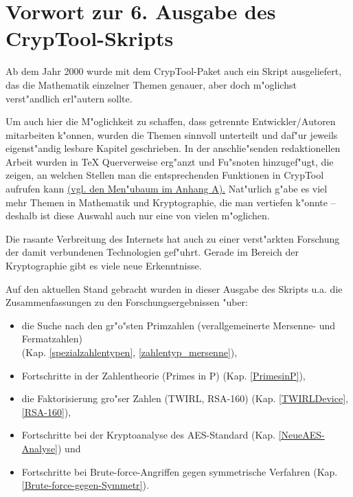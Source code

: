 

\section*{Vorwort zur 6. Ausgabe des CrypTool-Skripts}  

Ab dem Jahr 2000 wurde mit dem CrypTool-Paket auch ein Skript 
ausgeliefert, das die Mathematik einzelner Themen genauer, aber doch 
m"oglichst verst"andlich erl"autern sollte.

Um auch hier die M"oglichkeit zu schaffen, dass getrennte Entwickler/Autoren
mitarbeiten k"onnen, wurden die Themen sinnvoll unterteilt und daf"ur jeweils
eigenst"andig lesbare Kapitel geschrieben. In der anschlie"senden redaktionellen
Arbeit wurden in TeX Querverweise erg"anzt und Fu"snoten hinzugef"ugt, die
zeigen, an welchen Stellen man die entsprechenden Funktionen in
CrypTool aufrufen kann 
\hyperlink{appendix-menutree}{(vgl. den Men"ubaum im Anhang A).}
Nat"urlich g"abe es viel mehr Themen in Mathematik und Kryptographie, die
man vertiefen k"onnte -- deshalb ist diese Auswahl auch nur eine von
vielen m"oglichen.

Die rasante Verbreitung des Internets hat auch zu einer verst"arkten 
Forschung der damit verbundenen Technologien gef"uhrt. Gerade im Bereich 
der Kryptographie gibt es viele neue Erkenntnisse.

Auf den aktuellen Stand gebracht wurden in dieser Ausgabe 
des Skripts u.a. die Zusammenfassungen zu den Forschungsergebnissen "uber:                   
\vspace{-7pt}
\begin{itemize}
  \item die Suche nach den gr"o"sten Primzahlen (verallgemeinerte
        Mersenne- und Fermatzahlen) \\
	(Kap. \ref{spezialzahlentypen}, \ref{zahlentyp_mersenne}),
  \item Fortschritte in der Zahlentheorie (\glqq Primes in P\grqq)
        (Kap. \ref{PrimesinP}),
  \item die Faktorisierung gro"ser Zahlen (TWIRL, RSA-160) 
        (Kap. \ref{TWIRLDevice}, \ref{RSA-160}),
  \item Fortschritte bei der Kryptoanalyse des AES-Standard 
        (Kap. \ref{NeueAES-Analyse}) und
  \item Fortschritte bei Brute-force-Angriffen gegen symmetrische Verfahren
	(Kap. \ref{Brute-force-gegen-Symmetr}).
\end{itemize}

